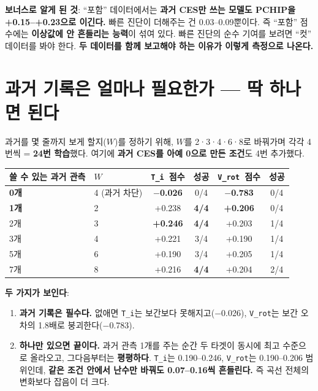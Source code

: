\documentclass[10pt]{article}
\newcommand{\Ti}{\texttt{T\_i}}
\newcommand{\Vrot}{\texttt{V\_rot}}
\begin{document}
\textbf{보너스로 알게 된 것}: ``포함'' 데이터에서는 \textbf{과거 CES만 쓰는 모델도 PCHIP을
+0.15--+0.23으로 이긴다.} 빠른 진단이 더해주는 건 0.03--0.09뿐이다. 즉 ``포함'' 점수에는
\textbf{이상값에 안 흔들리는 능력}이 섞여 있다. 빠른 진단의 순수 기여를 보려면 ``컷''
데이터를 봐야 한다. \textbf{두 데이터를 함께 보고해야 하는 이유가 이렇게 측정으로 나온다.}

\section{과거 기록은 얼마나 필요한가 --- 딱 하나면 된다}

과거를 몇 줄까지 보게 할지($W$)를 정하기 위해, $W$를 2·3·4·6·8로 바꿔가며 각각 4번씩 =
\textbf{24번 학습}했다. 여기에 \textbf{과거 CES를 아예 0으로 만든 조건}도 4번 추가했다.

\begin{center}
\begin{tabular}{@{}llcccc@{}}
\toprule
\textbf{쓸 수 있는 과거 관측} & \textbf{$W$} & \textbf{\Ti\ 점수} & \textbf{성공} &
  \textbf{\Vrot\ 점수} & \textbf{성공} \\
\midrule
\textbf{0개} & 4 (과거 차단) & \textbf{$-$0.026} & 0/4 & \textbf{$-$0.783} & 0/4 \\
\textbf{1개} & 2 & +0.238 & \textbf{4/4} & \textbf{+0.206} & 0/4 \\
2개 & 3 & \textbf{+0.246} & \textbf{4/4} & +0.203 & 1/4 \\
3개 & 4 & +0.221 & 3/4 & +0.190 & 1/4 \\
5개 & 6 & +0.190 & 3/4 & +0.205 & 1/4 \\
7개 & 8 & +0.216 & \textbf{4/4} & +0.204 & 2/4 \\
\bottomrule
\end{tabular}
\end{center}

\textbf{두 가지가 보인다}:
\begin{enumerate}
\item \textbf{과거 기록은 필수다.} 없애면 \Ti 는 보간보다 못해지고($-$0.026), \Vrot 는
  보간 오차의 1.8배로 붕괴한다($-$0.783).
\item \textbf{하나만 있으면 끝이다.} 과거 관측 1개를 주는 순간 두 타겟이 동시에 최고 수준으로
  올라오고, 그다음부터는 \textbf{평평하다}. \Ti 는 0.190--0.246, \Vrot 는 0.190--0.206
  범위인데, \textbf{같은 조건 안에서 난수만 바꿔도 0.07--0.16씩 흔들린다.} 즉 곡선 전체의
  변화보다 잡음이 더 크다.
\end{enumerate}
\end{document}
